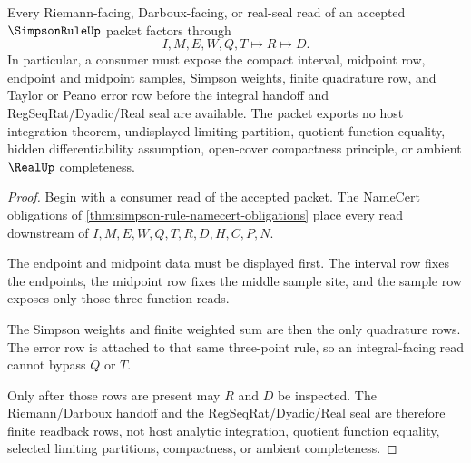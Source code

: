 \begin{theorem}
\label{thm:simpson-rule-quadrature-error-nonescape}
Every Riemann-facing, Darboux-facing, or real-seal read of an accepted $\SimpsonRuleUp$ packet factors through
$$
I,M,E,W,Q,T \longmapsto R \longmapsto D .
$$
In particular, a consumer must expose the compact interval, midpoint row, endpoint and midpoint samples, Simpson weights, finite quadrature row, and Taylor or Peano error row before the integral handoff and RegSeqRat/Dyadic/Real seal are available. The packet exports no host integration theorem, undisplayed limiting partition, quotient function equality, hidden differentiability assumption, open-cover compactness principle, or ambient $\RealUp$ completeness.
\end{theorem}
\begin{proof}
Begin with a consumer read of the accepted packet. The NameCert obligations of \autoref{thm:simpson-rule-namecert-obligations} place every read downstream of $I,M,E,W,Q,T,R,D,H,C,P,N$.

The endpoint and midpoint data must be displayed first. The interval row fixes the endpoints, the midpoint row fixes the middle sample site, and the sample row exposes only those three function reads.

The Simpson weights and finite weighted sum are then the only quadrature rows. The error row is attached to that same three-point rule, so an integral-facing read cannot bypass $Q$ or $T$.

Only after those rows are present may $R$ and $D$ be inspected. The Riemann/Darboux handoff and the RegSeqRat/Dyadic/Real seal are therefore finite readback rows, not host analytic integration, quotient function equality, selected limiting partitions, compactness, or ambient completeness.
\end{proof}




